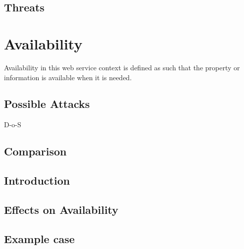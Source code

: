 \begin{sloppypar}
\subsection{Threats}
\begin{sloppypar}

\end{sloppypar}




\section{Availability}
\begin{sloppypar}
    Availability in this web service context is defined as such that the property or information 
    is available when it is needed.
\end{sloppypar}

\subsection{Possible Attacks}
\begin{sloppypar}
    D-o-S 
\end{sloppypar}

\subsection{Comparison}
\begin{sloppypar}
    
\end{sloppypar}

\subsection{Introduction}
\begin{sloppypar}

\end{sloppypar}

\subsection{Effects on Availability}
\begin{sloppypar}

\end{sloppypar}

\subsection{Example case}
\begin{sloppypar}


\end{sloppypar}
\end{sloppypar}
